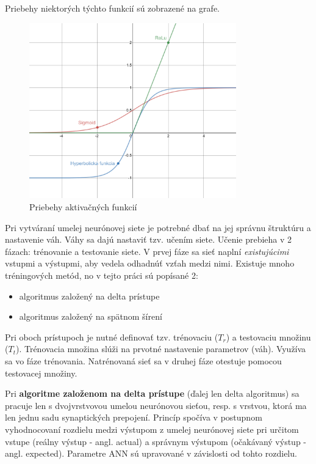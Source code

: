 Priebehy niektorých týchto funkcií sú zobrazené na grafe.
\begin{figure}[H]
    \centering
    \includegraphics[width=0.8\textwidth]{images/activation-functions.png}
    \caption{Priebehy aktivačných funkcií}
\end{figure}\label{figure:activation-functions}

Pri vytváraní umelej neurónovej siete je potrebné dbať na jej správnu štruktúru a nastavenie váh.
Váhy sa dajú nastaviť tzv. učením siete.
Učenie prebieha v 2 fázach: trénovanie a testovanie siete.
V prvej fáze sa sieť naplní \emph{existujúcimi} vstupmi a výstupmi, aby vedela odhadnúť vzťah medzi nimi.
Existuje mnoho tréningových metód, no v tejto práci sú popísané 2:
\begin{itemize}
    \item algoritmus založený na delta prístupe\cite{algo_ann_delta_rule}
    \item algoritmus založený na spätnom šírení\cite{algo_ann_backpropagation}
\end{itemize}
Pri oboch prístupoch je nutné definovať tzv. trénovaciu ($T_r$) a testovaciu množinu ($T_t$).
Trénovacia množina slúži na prvotné nastavenie parametrov (váh).
Využíva sa vo fáze trénovania.
Natrénovaná sieť sa v druhej fáze otestuje pomocou testovacej množiny.

Pri \textbf{algoritme založenom na delta prístupe} (ďalej len delta algoritmus) sa pracuje len s dvojvrstvovou
umelou neurónovou sieťou, resp. s vrstvou, ktorá ma len jednu sadu synaptických prepojení.
Princíp spočíva v postupnom vyhodnocovaní rozdielu medzi výstupom z umelej neurónovej siete pri určitom vstupe
(reálny výstup - angl. actual) a správnym výstupom (očakávaný výstup - angl. expected).
Parametre ANN sú upravované v závislosti od tohto rozdielu.

